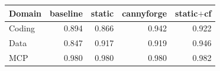 \begin{tabular}{lrrrr}
\toprule
Domain & baseline & static & cannyforge & static$+$cf \\
\midrule
Coding  & 0.894 & 0.866 & 0.942 & 0.922 \\
Data    & 0.847 & 0.917 & 0.919 & 0.946 \\
MCP     & 0.980 & 0.980 & 0.980 & 0.982 \\
\bottomrule
\end{tabular}
